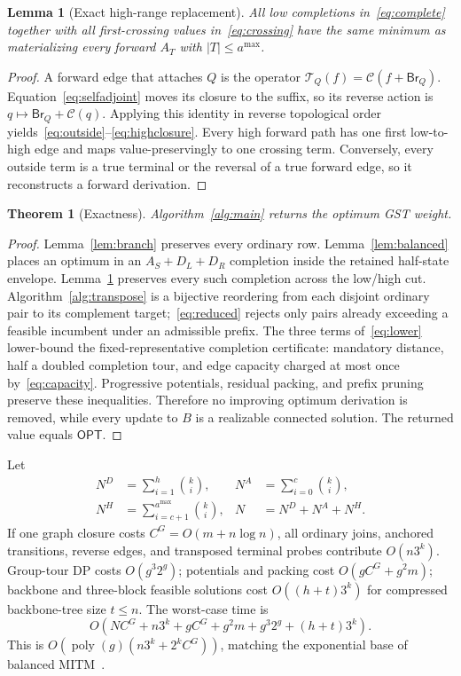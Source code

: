 \documentclass[sigconf,nonacm]{acmart}
\newtheorem{theorem}{Theorem}
\newtheorem{lemma}{Lemma}
\newcommand{\Clos}{\mathcal{C}}
\newcommand{\Br}{\mathsf{Br}}
\newcommand{\OPT}{\mathsf{OPT}}
\begin{document}
\begin{lemma}[Exact high-range replacement]
\label{lem:outside}
All low completions in~\eqref{eq:complete} together with all first-crossing values in~\eqref{eq:crossing} have the same minimum as materializing every forward $A_T$ with $|T|\leq a^{\max}$.
\end{lemma}
\begin{proof}
A forward edge that attaches $Q$ is the operator $\mathcal{T}_Q(f)=\Clos(f+\Br_Q)$.  Equation~\eqref{eq:selfadjoint} moves its closure to the suffix, so its reverse action is $q\mapsto\Br_Q+\Clos(q)$.  Applying this identity in reverse topological order yields~\eqref{eq:outside}--\eqref{eq:highclosure}.  Every high forward path has one first low-to-high edge and maps value-preservingly to one crossing term.  Conversely, every outside term is a true terminal or the reversal of a true forward edge, so it reconstructs a forward derivation.
\end{proof}

\begin{theorem}[Exactness]
\label{thm:exact}
Algorithm~\ref{alg:main} returns the optimum GST weight.
\end{theorem}
\begin{proof}
Lemma~\ref{lem:branch} preserves every ordinary row.  Lemma~\ref{lem:balanced} places an optimum in an $A_S+D_L+D_R$ completion inside the retained half-state envelope.  Lemma~\ref{lem:outside} preserves every such completion across the low/high cut.  Algorithm~\ref{alg:transpose} is a bijective reordering from each disjoint ordinary pair to its complement target;~\eqref{eq:reduced} rejects only pairs already exceeding a feasible incumbent under an admissible prefix.  The three terms of~\eqref{eq:lower} lower-bound the fixed-representative completion certificate: mandatory distance, half a doubled completion tour, and edge capacity charged at most once by~\eqref{eq:capacity}.  Progressive potentials, residual packing, and prefix pruning preserve these inequalities.  Therefore no improving optimum derivation is removed, while every update to $B$ is a realizable connected solution.  The returned value equals $\OPT$.
\end{proof}

Let
\begin{align*}
 N^D&=\sum_{i=1}^{h}\binom{k}{i}, &
 N^A&=\sum_{i=0}^{c}\binom{k}{i},\\
 N^H&=\sum_{i=c+1}^{a^{\max}}\binom{k}{i}, &
 N&=N^D+N^A+N^H.
\end{align*}
If one graph closure costs $C^G=O(m+n\log n)$, all ordinary joins, anchored transitions, reverse edges, and transposed terminal probes contribute $O(n3^k)$.  Group-tour DP costs $O(g^3 2^g)$; potentials and packing cost $O(gC^G+g^2m)$; backbone and three-block feasible solutions cost $O((h+t)3^k)$ for compressed backbone-tree size $t\leq n$.  The worst-case time is
\begin{equation}
 O\!\left(NC^G+n3^k+gC^G+g^2m+g^3 2^g+(h+t)3^k\right).
 \label{eq:time}
\end{equation}
This is $O(\operatorname{poly}(g)(n3^k+2^kC^G))$, matching the exponential base of balanced MITM~\cite{iwata2019}.
\end{document}
